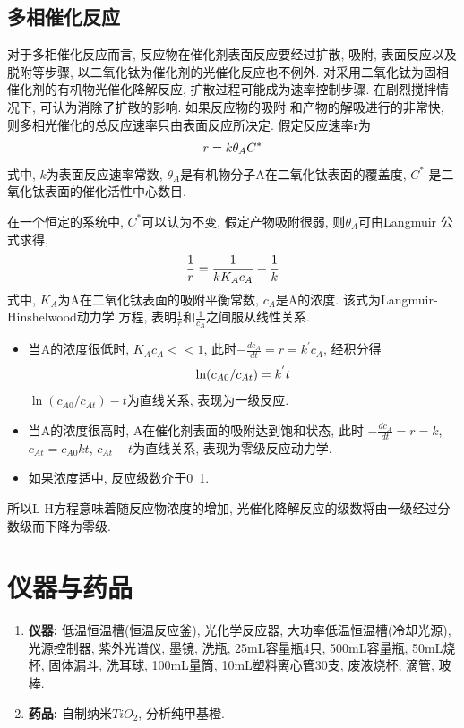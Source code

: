 \documentclass[a4paper]{article}
\begin{document}
\subsection{多相催化反应}
对于多相催化反应而言, 反应物在催化剂表面反应要经过扩散, 吸附, 表面反应以及脱附等步骤, 
以二氧化钛为催化剂的光催化反应也不例外. 对采用二氧化钛为固相催化剂的有机物光催化降解反应, 
扩散过程可能成为速率控制步骤. 在剧烈搅拌情况下, 可认为消除了扩散的影响. 如果反应物的吸附
和产物的解吸进行的非常快, 则多相光催化的总反应速率只由表面反应所决定. 假定反应速率r为
\begin{equation}
	r = k\theta_{A}C^{*}\\
\end{equation}
式中, $k$为表面反应速率常数, $\theta_{A}$是有机物分子A在二氧化钛表面的覆盖度, $C^{*}$
是二氧化钛表面的催化活性中心数目.
\par
在一个恒定的系统中, $C^{*}$可以认为不变, 假定产物吸附很弱, 则$\theta_{A}$可由Langmuir
公式求得, 
\begin{equation}
	\frac{1}{r} = \frac{1}{kK_{A}c_{A}} + \frac{1}{k}\\
\end{equation}
式中, $K_{A}$为A在二氧化钛表面的吸附平衡常数, $c_{A}$是A的浓度. 该式为Langmuir-Hinshelwood动力学
方程, 表明$\frac{1}{r}$和$\frac{1}{c_{A}}$之间服从线性关系.
\begin{itemize}
	\item 当A的浓度很低时, $K_{A}c_{A} << 1$, 此时$-\frac{dc_{A}}{dt} = r = k^{'}c_{A}$, 
	经积分得
	\begin{equation}
		\ln(c_{A0}/c_{At}) = k^{'}t\\
	\end{equation}
	$\ln(c_{A0}/c_{At})-t$为直线关系, 表现为一级反应.
	\item 当A的浓度很高时, A在催化剂表面的吸附达到饱和状态, 
	此时 $-\frac{dc_{A}}{dt} = r = k$, $c_{At} = c_{A0}kt$, $c_{At}-t$为直线关系, 
	表现为零级反应动力学.
	\item 如果浓度适中, 反应级数介于0~1.
\end{itemize}
所以L-H方程意味着随反应物浓度的增加, 光催化降解反应的级数将由一级经过分数级而下降为零级.

\section{仪器与药品}
\begin{enumerate}
    \item \textbf{仪器:} 低温恒温槽(恒温反应釜), 光化学反应器, 大功率低温恒温槽(冷却光源), 
	光源控制器, 紫外光谱仪, 墨镜, 洗瓶, 25mL容量瓶4只, 500mL容量瓶, 
	50mL烧杯, 固体漏斗, 洗耳球, 100mL量筒, 10mL塑料离心管30支, 废液烧杯, 滴管, 玻棒.
    \item \textbf{药品:} 自制纳米$TiO_{2}$, 分析纯甲基橙.
\end{enumerate}
\end{document}

